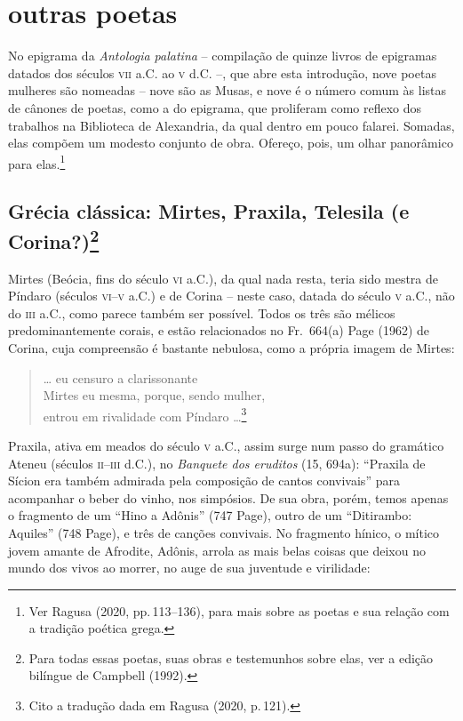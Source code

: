 \section*{outras poetas}

No epigrama da \textit{Antologia palatina} -- compilação de quinze livros de
epigramas datados dos séculos \textsc{vii} a.C. ao \textsc{v} d.C. --, que abre esta introdução,
nove poetas mulheres são nomeadas -- nove são as Musas, e nove é o número comum
às listas de cânones de poetas, como a do epigrama, que proliferam como reflexo
dos trabalhos na Biblioteca de Alexandria, da qual dentro em pouco falarei.
Somadas, elas compõem um modesto conjunto de obra.
Ofereço, pois, um olhar panorâmico para elas.\footnote{Ver Ragusa (2020, pp.\,113--136), para mais sobre as poetas e sua relação com a tradição poética grega.}

\subsection*{Grécia clássica: Mirtes, Praxila, Telesila (e
Corina?)\protect\footnote{\MakeUppercase{P}ara todas essas poetas, suas obras e testemunhos sobre elas, ver a edição bilíngue de \MakeUppercase{C}ampbell (1992).}}

\smallskip

Mirtes (Beócia, fins do século \textsc{vi} a.C.), da qual nada resta, teria sido mestra
de Píndaro (séculos \textsc{vi}--\textsc{v} a.C.) e de Corina -- neste caso, datada do século \textsc{v}
a.C., não do \textsc{iii} a.C., como parece também ser possível. Todos os três são
mélicos predominantemente corais, e estão relacionados no Fr.~664(a)
Page (1962) de Corina, cuja compreensão
é bastante nebulosa, como a própria imagem de Mirtes:


\begin{quote}
\ldots{} eu censuro a clarissonante\\
Mirtes eu mesma, porque, sendo mulher,\\
entrou em rivalidade com Píndaro \ldots{}\footnote{Cito a tradução dada em Ragusa (2020, p.\,121).}
\end{quote}

Praxila, ativa em meados do século \textsc{v} a.C., assim surge num passo do gramático
Ateneu (séculos \textsc{ii}--\textsc{iii} d.C.), no \textit{Banquete dos eruditos} (15, 694a):
``Praxila de Sícion era também admirada pela composição de cantos
convivais” para acompanhar o beber do vinho, nos simpósios. De sua obra,
porém, temos apenas o fragmento de um “Hino a Adônis” (747 Page), outro
de um “Ditirambo: Aquiles” (748 Page), e três de canções convivais. No fragmento
hínico, o mítico jovem amante de Afrodite, Adônis, arrola as mais belas coisas
que deixou no mundo dos vivos ao morrer, no auge de sua juventude e virilidade:


